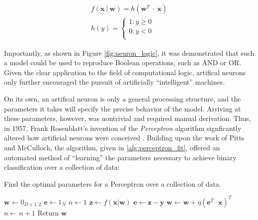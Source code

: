 \begin{align*}
  f(\mathbf{x}~|~\mathbf{w}) = h(\mathbf{w}^T~\cdot~\mathbf{x})\\
  h(y) = \left\{
    \begin{array}{ll}
      1 : y \ge 0\\
      0 : y < 0\\
    \end{array}
  \right.
\label{eq:perceptron}
\end{align*}

\noindent Importantly, as shown in Figure \ref{fig:neuron_logic}, it was demonstrated that such a model could be used to reproduce Boolean operations, such as AND or OR.
Given the clear application to the field of computational logic, artifical neurons only further encouraged the pursuit of artificially ``intelligent'' machines.

On its own, an artifical neuron is only a general processing structure, and the parameters it takes will specify the precise behavior of the model.
Arriving at these parameters, however, was nontrivial and required manual derivation.
Thus, in 1957, Frank Rosenblatt's invention of the \emph{Perceptron} algorithm signficantly altered how artificial neurons were conceived \cite{Rosenblatt1957}.
Building upon the work of Pitts and McCulloch, the algorithm, given in \ref{alg:perceptron_fit}, offered an automated method of ``learning'' the parameters necessary to achieve binary classification over a collection of data:

\begin{algorithm}[H]
\caption{Find the optimal parameters for a Perceptron over a collection of data.}
\label{array-sum}
\begin{algorithmic}[1]
    \State $\mathbf{w} \gets \mathcal{0}_{D + 1, 2}$
    \State $\mathbf{e} \gets \mathcal{1}_{N}$
    \State $n \gets 1$
        \State $\mathbf{z} \gets f(\mathbf{x} | \mathbf{w})$
        \State $\mathbf{e} \gets \mathbf{z} - \mathbf{y}$
        \State $\mathbf{w} \gets \mathbf{w} + \eta (\mathbf{e}^T \cdot \mathbf{x})^T$
        \State $n \gets n + 1$
    \EndWhile
    \State Return $\mathbf{w}$
\EndProcedure
\end{algorithmic}
\end{algorithm}

